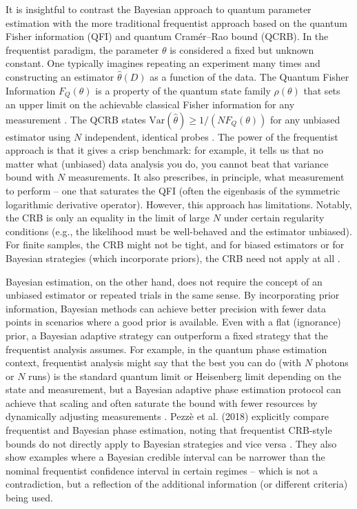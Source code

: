 It is insightful to contrast the Bayesian approach to quantum
parameter estimation with the more traditional frequentist approach
based on the quantum Fisher information (QFI) and quantum Cramér–Rao
bound (QCRB). In the frequentist paradigm, the parameter $\theta$ is
considered a fixed but unknown constant. One typically imagines
repeating an experiment many times and constructing an estimator
$\hat{\theta}(D)$ as a function of the data. The Quantum Fisher
Information $F_Q(\theta)$ is a property of the quantum state family
$\rho(\theta)$ that sets an upper limit on the achievable classical
Fisher information for any measurement . The QCRB states
$\mathrm{Var}(\hat{\theta}) \ge 1/(N F_Q(\theta))$ for any unbiased
estimator using $N$ independent, identical probes . The power of the
frequentist approach is that it gives a crisp benchmark: for example,
it tells us that no matter what (unbiased) data analysis you do, you
cannot beat that variance bound with $N$ measurements. It also
prescribes, in principle, what measurement to perform – one that
saturates the QFI (often the eigenbasis of the symmetric logarithmic
derivative operator). However, this approach has limitations. Notably,
the CRB is only an equality in the limit of large $N$ under certain
regularity conditions (e.g., the likelihood must be well-behaved and
the estimator unbiased). For finite samples, the CRB might not be
tight, and for biased estimators or for Bayesian strategies (which
incorporate priors), the CRB need not apply at all .



Bayesian estimation, on the other hand, does not require the concept
of an unbiased estimator or repeated trials in the same sense. By
incorporating prior information, Bayesian methods can achieve better
precision with fewer data points in scenarios where a good prior is
available. Even with a flat (ignorance) prior, a Bayesian adaptive
strategy can outperform a fixed strategy that the frequentist analysis
assumes. For example, in the quantum phase estimation context,
frequentist analysis might say that the best you can do (with $N$
photons or $N$ runs) is the standard quantum limit or Heisenberg limit
depending on the state and measurement, but a Bayesian adaptive phase
estimation protocol can achieve that scaling and often saturate the
bound with fewer resources by dynamically adjusting measurements
. Pezzè et al. (2018) explicitly compare frequentist and Bayesian
phase estimation, noting that frequentist CRB-style bounds do not
directly apply to Bayesian strategies and vice versa . They also show
examples where a Bayesian credible interval can be narrower than the
nominal frequentist confidence interval in certain regimes – which is
not a contradiction, but a reflection of the additional information
(or different criteria) being used.



